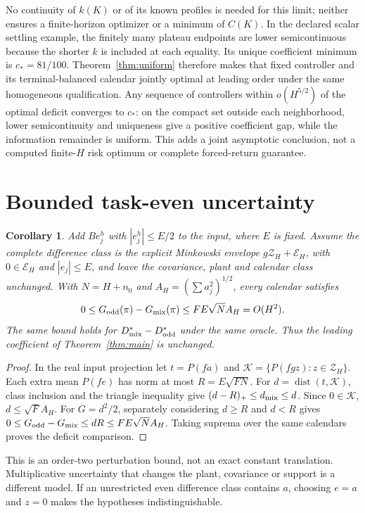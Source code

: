 \documentclass[11pt]{article}
\newtheorem{corollary}{Corollary}
\begin{document}
No continuity of $k(K)$ or of its known profiles is needed for this limit;
neither ensures a finite-horizon optimizer or a minimum of $C(K)$.
In the declared scalar settling example, the finitely many plateau endpoints
are lower semicontinuous because the shorter $k$ is included at each equality.
Its unique coefficient minimum is $c_*=81/100$.
Theorem~\ref{thm:uniform} therefore makes that fixed controller and its
terminal-balanced calendar jointly optimal at leading order under the same
homogeneous qualification. Any sequence of controllers within
$o(H^{5/2})$ of the optimal deficit converges to $c_*$: on the compact set
outside each neighborhood, lower semicontinuity and uniqueness give a positive
coefficient gap, while the information remainder is uniform.
This adds a joint asymptotic conclusion, not a computed finite-$H$ risk optimum
or complete forced-return guarantee.

\section{Bounded task-even uncertainty}
\begin{corollary}\label{cor:even}
Add $Be_j^h$ with $|e_j^h|\le E/2$ to the input, where $E$ is fixed.
Assume the complete difference class is the explicit Minkowski envelope
$g\mathcal Z_H+\mathcal E_H$, with $0\in\mathcal E_H$ and
$|e_j|\le E$, and leave the covariance, plant and calendar class unchanged.
With $N=H+n_0$ and $A_H=(\sum a_j^2)^{1/2}$, every calendar satisfies
\[
0\le G_{\rm odd}(\pi)-G_{\rm mix}(\pi)
\le FE\sqrt N A_H=O(H^2).
\]
The same bound holds for $D_{\rm mix}^*-D_{\rm odd}^*$ under the same oracle.
Thus the leading coefficient of Theorem~\ref{thm:main} is unchanged.
\end{corollary}
\begin{proof}
In the real input projection let $t=P(fa)$ and
$\mathcal K=\{P(fgz):z\in\mathcal Z_H\}$.
Each extra mean $P(fe)$ has norm at most $R=E\sqrt{FN}$.
For $d=\operatorname{dist}(t,\mathcal K)$, class inclusion and the triangle
inequality give $(d-R)_+\le d_{\rm mix}\le d$.
Since $0\in\mathcal K$, $d\le\sqrt F A_H$.
For $G=d^2/2$, separately considering $d\ge R$ and $d<R$ gives
$0\le G_{\rm odd}-G_{\rm mix}\le dR\le FE\sqrt N A_H$.
Taking suprema over the same calendars proves the deficit comparison.
\end{proof}
This is an order-two perturbation bound, not an exact constant translation.
Multiplicative uncertainty that changes the plant, covariance or support is a
different model. If an unrestricted even difference class contains $a$,
choosing $e=a$ and $z=0$ makes the hypotheses indistinguishable.
\end{document}
